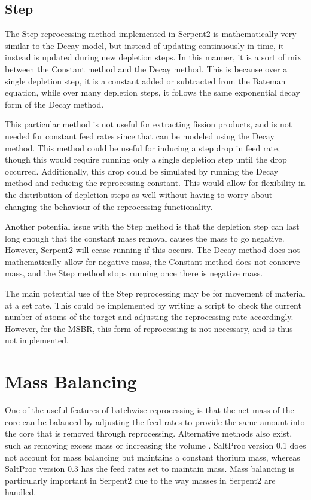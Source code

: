 \subsection{Step}

The Step reprocessing method implemented in Serpent2 is mathematically very similar to the Decay model, but instead of updating continuously in time, it instead is updated during new depletion steps. In this manner, it is a sort of mix between the Constant method and the Decay method. This is because over a single depletion step, it is a constant added or subtracted from the Bateman equation, while over many depletion steps, it follows the same exponential decay form of the Decay method.

This particular method is not useful for extracting fission products, and is not needed for constant feed rates since that can be modeled using the Decay method. This method could be useful for inducing a step drop in feed rate, though this would require running only a single depletion step until the drop occurred. Additionally, this drop could be simulated by running the Decay method and reducing the reprocessing constant. This would allow for flexibility in the distribution of depletion steps as well without having to worry about changing the behaviour of the reprocessing functionality. 

Another potential issue with the Step method is that the depletion step can last long enough that the constant mass removal causes the mass to go negative. However, Serpent2 will cease running if this occurs. The Decay method does not mathematically allow for negative mass, the Constant method does not conserve mass, and the Step method stops running once there is negative mass.

The main potential use of the Step reprocessing may be for movement of material at a set rate. This could be implemented by writing a script to check the current number of atoms of the target and adjusting the reprocessing rate accordingly. However, for the MSBR, this form of reprocessing is not necessary, and is thus not implemented.

\section{Mass Balancing}

One of the useful features of batchwise reprocessing is that the net mass of the core can be balanced by adjusting the feed rates to provide the same amount into the core that is removed through reprocessing. Alternative methods also exist, such as removing excess mass or increasing the volume \cite{ridley_method_2017}. SaltProc version 0.1 does not account for mass balancing but maintains a constant thorium mass, whereas SaltProc version 0.3 has the feed rates set to maintain mass. Mass balancing is particularly important in Serpent2 due to the way masses in Serpent2 are handled.

